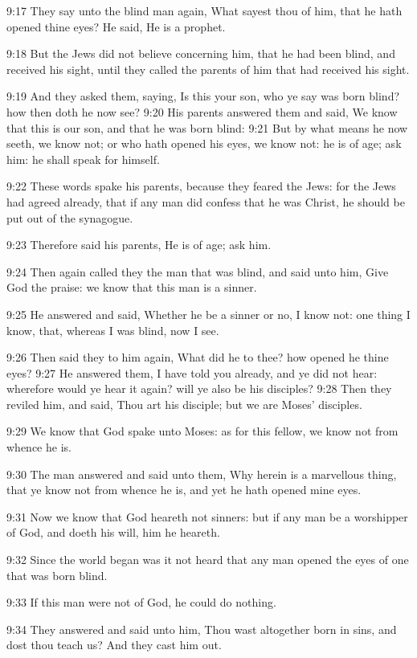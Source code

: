 9:17 They say unto the blind man again, What sayest thou of him, that he hath opened thine eyes? He said, He is a prophet.

9:18 But the Jews did not believe concerning him, that he had been blind, and received his sight, until they called the parents of him that had received his sight.

9:19 And they asked them, saying, Is this your son, who ye say was born blind? how then doth he now see?  9:20 His parents answered them and said, We know that this is our son, and that he was born blind: 9:21 But by what means he now seeth, we know not; or who hath opened his eyes, we know not: he is of age; ask him: he shall speak for himself.

9:22 These words spake his parents, because they feared the Jews: for the Jews had agreed already, that if any man did confess that he was Christ, he should be put out of the synagogue.

9:23 Therefore said his parents, He is of age; ask him.

9:24 Then again called they the man that was blind, and said unto him, Give God the praise: we know that this man is a sinner.

9:25 He answered and said, Whether he be a sinner or no, I know not: one thing I know, that, whereas I was blind, now I see.

9:26 Then said they to him again, What did he to thee? how opened he thine eyes?  9:27 He answered them, I have told you already, and ye did not hear: wherefore would ye hear it again? will ye also be his disciples?  9:28 Then they reviled him, and said, Thou art his disciple; but we are Moses' disciples.

9:29 We know that God spake unto Moses: as for this fellow, we know not from whence he is.

9:30 The man answered and said unto them, Why herein is a marvellous thing, that ye know not from whence he is, and yet he hath opened mine eyes.

9:31 Now we know that God heareth not sinners: but if any man be a worshipper of God, and doeth his will, him he heareth.

9:32 Since the world began was it not heard that any man opened the eyes of one that was born blind.

9:33 If this man were not of God, he could do nothing.

9:34 They answered and said unto him, Thou wast altogether born in sins, and dost thou teach us? And they cast him out.

